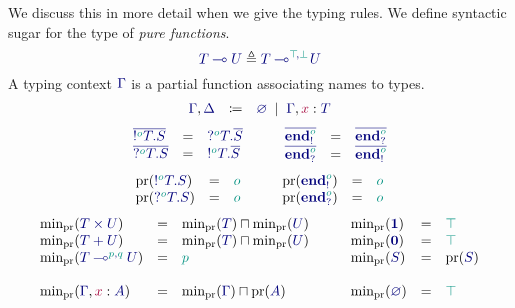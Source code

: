 \documentclass[main.tex]{subfiles}
\begin{document}
We discuss this in more detail when we give the typing rules.
We define syntactic sugar for the type of \emph{pure functions}.
\[
  \ty{\tylolli{T}{U}} \elabarrow \ty{\tylolli[\cs{\ptop},\cs{\pbot}]{T}{U}}
\]
A typing context $\ty\Gamma$ is a partial function associating names to types.
\[
\begin{array}{lcl}
  \ty{\Gamma}, \ty{\Delta}
  & \coloneqq & \ty{\emptyenv}
    \sep        \ty{\Gamma}, \tmty{x}{T}
\end{array}
\]
\[
\begin{array}{lcl}
  \ty{\co{\tysend[\cs{o}]{T}{S}}} & = & \ty{\tyrecv[\cs{o}]{T}{\co{S}}} \\
  \ty{\co{\tyrecv[\cs{o}]{T}{S}}} & = & \ty{\tysend[\cs{o}]{T}{\co{S}}}
\end{array}
\qquad
\begin{array}{lcl}
  \ty{\co{\tyends[\cs{o}]}} & = & \ty{\co{\tyendr[\cs{o}]}} \\
  \ty{\co{\tyendr[\cs{o}]}} & = & \ty{\co{\tyends[\cs{o}]}}
\end{array}
\]
\[
\begin{array}{lcl}
  \pr(\ty{\tysend[\cs{o}]{T}{S}})            & = & \cs{o} \\
  \pr(\ty{\tyrecv[\cs{o}]{T}{S}})            & = & \cs{o} \\
\end{array}
\qquad
\begin{array}{lcl}
  \pr(\ty{\tyends[\cs{o}]})                  & = & \cs{o} \\
  \pr(\ty{\tyendr[\cs{o}]})                  & = & \cs{o} \\
\end{array}
\]
\[
\begin{array}{lcl}
  \minpr(\ty{\typrod{T}{U}})                 & = & \minpr({\ty{T}})\sqcap\minpr({\ty{U}}) \\
  \minpr(\ty{\tysum{T}{U}})                  & = & \minpr({\ty{T}})\sqcap\minpr({\ty{U}}) \\
  \minpr(\ty{\tylolli[\cs{p},\cs{q}]{T}{U}}) & = & \cs{p} \\
  \\
  \minpr(\ty{\Gamma}, \tmty{x}{A})           & = & \minpr(\ty{\Gamma})\sqcap\pr(\ty{A})
\end{array}
\qquad
\begin{array}{lcl}
  \minpr(\ty{\tyunit})                       & = & \ptop \\
  \minpr(\ty{\tyvoid})                       & = & \ptop \\
  \minpr(\ty{S})                             & = & \pr(\ty{S}) \\
  \\
  \minpr(\ty{\emptyenv})                     & = & \ptop
\end{array}
\]
\end{document}
